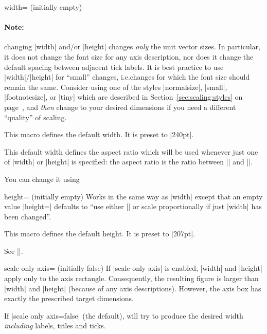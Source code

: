 \begin{pgfplotskey}{width= (initially empty)}
    \paragraph{Note:}

    changing |width| and/or |height| changes \emph{only} the unit vector sizes.
    In particular, it does not change the font size for any axis description,
    nor does it change the default spacing between adjacent tick labels. It is
    best practice to use |width|/|height| for ``small'' changes, i.e.\@ changes
    for which the font size should remain the same. Consider using one of the
    styles |normalsize|, |small|, |footnotesize|, or |tiny| which are described
    in Section~\ref{sec:scaling:styles} on page~\pageref{sec:scaling:styles},
    and \emph{then} change to your desired dimensions if you need a different
    ``quality'' of scaling.

    \begin{command}{\axisdefaultwidth}
        This macro defines the default width. It is preset to |240pt|.

        This default width defines the aspect ratio which will be used whenever
        just one of |width| or |height| is specified: the aspect ratio is the
        ratio between |\axisdefaultwidth| and |\axisdefaultheight|.

        You can change it using
\begin{codeexample}
\def\axisdefaultwidth{10cm}
\end{codeexample}
    \end{command}
\end{pgfplotskey}

\begin{pgfplotskey}{height= (initially empty)}
    Works in the same way as |width| except that an empty value |height={}|
    defaults to ``use either |\axisdefaultheight| or scale proportionally if
    just |width| has been changed''.

    \begin{command}{\axisdefaultheight}
        This macro defines the default height. It is preset to |207pt|.

        See |\axisdefaultwidth|.
    \end{command}
\end{pgfplotskey}

\begin{pgfplotskey}{scale only axis= (initially false)}
    If |scale only axis| is enabled, |width| and |height| apply only to the
    axis rectangle. Consequently, the resulting figure is larger than |width|
    and |height| (because of any axis descriptions). However, the axis box has
    exactly the prescribed target dimensions.

    If |scale only axis=false| (the default), \PGFPlots{} will try to produce
    the desired width \emph{including} labels, titles and ticks.
\end{pgfplotskey}

